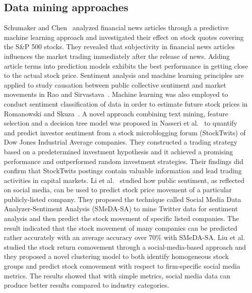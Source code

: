 \documentclass[review,3p,times,12pt,number]{elsarticle}
\begin{document}
\subsection{Data mining approaches}
Schumaker and Chen~\cite{schumaker2009textual} analyzed financial news articles through a predictive machine learning approach and investigated their effect on stock quotes covering the S\&P 500 stocks. They revealed that subjectivity in financial news articles influences the market trading immediately after the release of news. Adding article terms into prediction models exhibits the best performance in getting close to the actual stock price.
Sentiment analysis and machine learning principles are applied to study causation between public collective sentiment and market movements in Rao and Sirvastava~\cite{Rao2012TweetSmart}.
Machine learning was also employed to conduct sentiment classification of data in order to estimate future stock prices in Romanowski and Skuza~\cite{Romanowski2017}.
A novel approach combining text mining, feature selection and a decision tree model was proposed in Nasseri et al.~\cite{Nasseri2015Quantifying} to quantify and predict investor sentiment from a stock microblogging forum (StockTwits) of Dow Jones Industrial Average companies. They constructed a trading strategy based on a predetermined investment hypothesis and it achieved a promising performance and outperformed random investment strategies. Their findings did confirm that StockTwits postings contain valuable information and lead trading activities in capital markets.
Li et al.~\cite{Li2017Discovering} studied how public sentiment, as reflected on social media, can be used to predict stock price movement of a particular publicly-listed company. They proposed the technique called Social Media Data Analyzer-Sentiment Analysis (SMeDA-SA) to mine Twitter data for sentiment analysis and then predict the stock movement of specific listed companies. The result indicated that the stock movement of many companies can be predicted rather accurately with an average accuracy over 70\% with SMeDA-SA.
Liu et al.~\cite{Liu2015A} studied the stock return comovement through a social-media-based approach and they proposed a novel clustering model to both identify homogeneous stock groups and predict stock comovement with respect to firm-specific social media metrics. The results showed that with simple metrics, social media data can produce better results compared to industry categories.
\end{document}
